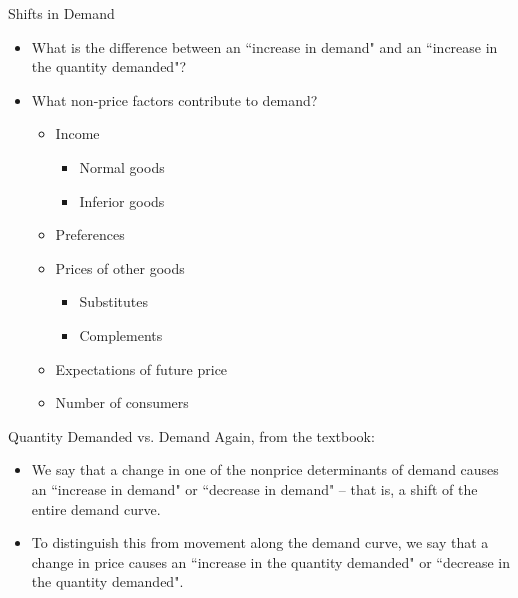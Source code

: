 \documentclass{beamer}
\begin{document}
\begin{frame}{Shifts in Demand}
    \begin{itemize}
        \item What is the difference between an ``increase in demand" and an ``increase in the quantity demanded"?
        \item What non-price factors contribute to demand?
        \begin{itemize}
            \item Income
            \begin{itemize}
                \item Normal goods
                \item Inferior goods
            \end{itemize}
            \item Preferences
            \item Prices of other goods
            \begin{itemize}
                \item Substitutes
                \item Complements
            \end{itemize}
            \item Expectations of future price
            \item Number of consumers
        \end{itemize}
    \end{itemize}
\end{frame}

\begin{frame}{Quantity Demanded vs. Demand}
    Again, from the textbook:
    \begin{itemize}
        \item We say that a change in one of the nonprice determinants of demand causes an ``increase in demand" or ``decrease in demand" -- that is, a shift of the entire demand curve.
        \item To distinguish this from movement along the demand curve, we say that a change in price causes an ``increase in the quantity demanded" or ``decrease in the quantity demanded".
    \end{itemize}
\end{frame}
\end{document}
